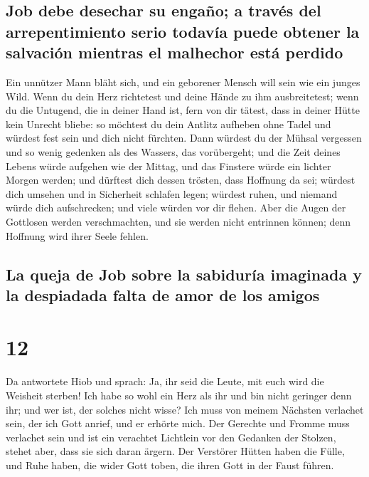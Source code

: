 \hypertarget{job-debe-desechar-su-engauxf1o-a-travuxe9s-del-arrepentimiento-serio-todavuxeda-puede-obtener-la-salvaciuxf3n-mientras-el-malhechor-estuxe1-perdido}{%
\subsection{Job debe desechar su engaño; a través del arrepentimiento
serio todavía puede obtener la salvación mientras el malhechor está
perdido}\label{job-debe-desechar-su-engauxf1o-a-travuxe9s-del-arrepentimiento-serio-todavuxeda-puede-obtener-la-salvaciuxf3n-mientras-el-malhechor-estuxe1-perdido}}

 Ein unnützer Mann bläht sich, und ein geborener Mensch
will sein wie ein junges Wild.  Wenn du dein Herz
richtetest und deine Hände zu ihm ausbreitetest;  wenn du
die Untugend, die in deiner Hand ist, fern von dir tätest, dass in
deiner Hütte kein Unrecht bliebe:  so möchtest du dein
Antlitz aufheben ohne Tadel und würdest fest sein und dich nicht
fürchten.  Dann würdest du der Mühsal vergessen und so
wenig gedenken als des Wassers, das vorübergeht;  und die
Zeit deines Lebens würde aufgehen wie der Mittag, und das Finstere würde
ein lichter Morgen werden;  und dürftest dich dessen
trösten, dass Hoffnung da sei; würdest dich umsehen und in Sicherheit
schlafen legen;  würdest ruhen, und niemand würde dich
aufschrecken; und viele würden vor dir flehen.  Aber die
Augen der Gottlosen werden verschmachten, und sie werden nicht entrinnen
können; denn Hoffnung wird ihrer Seele fehlen.

\hypertarget{la-queja-de-job-sobre-la-sabiduruxeda-imaginada-y-la-despiadada-falta-de-amor-de-los-amigos}{%
\subsection{La queja de Job sobre la sabiduría imaginada y la despiadada
falta de amor de los
amigos}\label{la-queja-de-job-sobre-la-sabiduruxeda-imaginada-y-la-despiadada-falta-de-amor-de-los-amigos}}

\hypertarget{section-11}{%
\section{12}\label{section-11}}

 Da antwortete Hiob und sprach:  Ja, ihr
seid die Leute, mit euch wird die Weisheit sterben!  Ich
habe so wohl ein Herz als ihr und bin nicht geringer denn ihr; und wer
ist, der solches nicht wisse?  Ich muss von meinem
Nächsten verlachet sein, der ich Gott anrief, und er erhörte mich. Der
Gerechte und Fromme muss verlachet sein  und ist ein
verachtet Lichtlein vor den Gedanken der Stolzen, stehet aber, dass sie
sich daran ärgern.  Der Verstörer Hütten haben die Fülle,
und Ruhe haben, die wider Gott toben, die ihren Gott in der Faust
führen.

